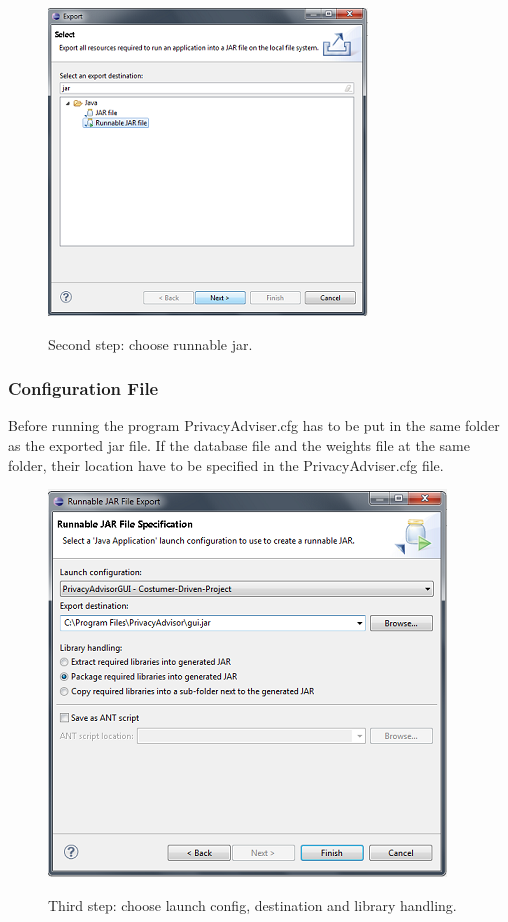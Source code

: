   \begin{figure}
    \begin{centering}
      \vspace{-10pt}
      \includegraphics[width = .48\textwidth]{Documentation/export_jar.png}
      \vspace{-10pt}
      \caption{Second step: choose runnable jar.}
      \vspace{-10pt}
      \label{exportSecondStep}
    \end{centering}
  \end{figure}

\subsubsection{Configuration File}
Before running the program PrivacyAdviser.cfg has to be put in the same folder as the exported jar file. If the database file and the weights file at the same folder, their location have to be specified in the PrivacyAdviser.cfg file. 

\begin{figure}
  \begin{centering}
    \vspace{-10pt}
    \includegraphics[width = .48\textwidth]{Documentation/export_last.png}
    \vspace{-10pt}
    \caption{Third step: choose launch config, destination and library handling.}
    \vspace{-10pt}
    \label{exportLastStep}
  \end{centering}
\end{figure}



